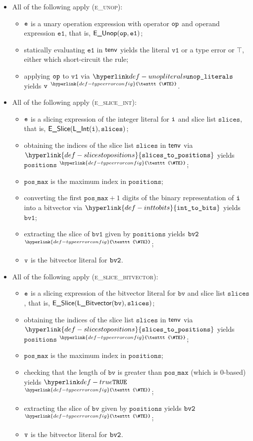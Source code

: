 \documentclass{book}
\newcommand\TypeErrorConfig[0]{\hyperlink{def-typeerrorconfig}{\texttt{\#TE}}}
\newcommand\ProseOrTypeError[0]{\hyperlink{def-proseortypeerror}{$^{\TypeErrorConfig}$}}
\newcommand\slicestopositions[0]{\hyperlink{def-slicestopositions}{\texttt{slices\_to\_positions}}}
\newcommand\UnsupportedExpression[0]{\top}
\newcommand\inttobits[0]{\hyperlink{def-inttobits}{\texttt{int\_to\_bits}}}
\newcommand\vvone[0]{\texttt{v1}}
\newcommand\veone[0]{\texttt{e1}}
\newcommand\vslices[0]{\texttt{slices}}
\newcommand\positions[0]{\texttt{positions}}
\newcommand\posmax[0]{\texttt{pos\_max}}
\newcommand\bv[0]{\texttt{bv}}
\newcommand\bvone[0]{\texttt{bv1}}
\begin{document}
\begin{itemize}
  \item All of the following apply (\textsc{e\_unop}):
  \begin{itemize}
    \item $\texttt{e}$ is a unary operation expression with operator $\texttt{op}$ and operand expression $\veone$,
          that is, $\EUnop(\op, \veone)$;
    \item statically evaluating $\veone$ in $\textsf{tenv}$ yields the literal $\vvone$ or a type error or $\UnsupportedExpression$,
          either which short-circuit the rule;
    \item applying $\texttt{op}$ to $\vvone$ via $\unopliterals$ yields $\texttt{v}$ \ProseOrTypeError.
  \end{itemize}

  \item All of the following apply (\textsc{e\_slice\_int}):
  \begin{itemize}
    \item $\texttt{e}$ is a slicing expression of the integer literal for $\texttt{i}$ and slice list $\vslices$, that is,
          $\ESlice(\lint(\vi), \vslices)$;
    \item obtaining the indices of the slice list $\vslices$ in $\textsf{tenv}$ via $\slicestopositions$
          yields $\positions$ \ProseOrTypeError;
    \item $\posmax$ is the maximum index in $\positions$;
    \item converting the first $\posmax+1$ digits of the binary representation of $\texttt{i}$ into a bitvector
          via $\inttobits$ yields $\bvone$;
    \item extracting the slice of $\bvone$ given by $\positions$ yields $\texttt{bv2}$ \ProseOrTypeError;
    \item $\texttt{v}$ is the bitvector literal for $\texttt{bv2}$.
  \end{itemize}

  \item All of the following apply (\textsc{e\_slice\_bitvector}):
  \begin{itemize}
    \item $\texttt{e}$ is a slicing expression of the bitvector literal for $\bv$ and slice list $\vslices$, that is,
          $\ESlice(\lbitvector(\bv), \vslices)$;
    \item obtaining the indices of the slice list $\vslices$ in $\textsf{tenv}$ via $\slicestopositions$
          yields $\positions$ \ProseOrTypeError;
    \item $\posmax$ is the maximum index in $\positions$;
    \item checking that the length of $\bv$ is greater than $\posmax$ (which is $0$-based) yields $\True$ \ProseOrTypeError;
    \item extracting the slice of $\bv$ given by $\positions$ yields $\texttt{bv2}$ \ProseOrTypeError;
    \item $\texttt{v}$ is the bitvector literal for $\texttt{bv2}$.
  \end{itemize}


\end{itemize}
\end{document}
